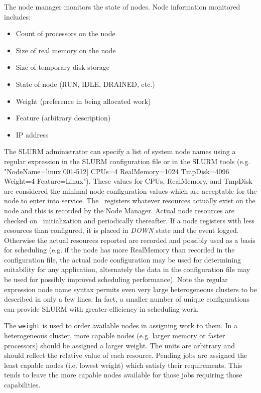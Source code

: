 The node manager monitors the state of nodes.  
Node information monitored includes:

\begin{itemize}
\item Count of processors on the node
\item Size of real memory on the node
\item Size of temporary disk storage
\item State of node (RUN, IDLE, DRAINED, etc.)
\item Weight (preference in being allocated work)
\item Feature (arbitrary description)
\item IP address
\end{itemize}

The SLURM administrator can specify a list of system node
names using a regular expression in the SLURM configuration file 
or in the SLURM tools (e.g. "NodeName=linux[001-512] CPUs=4
RealMemory=1024 TmpDisk=4096 Weight=4 Feature=Linux").  These values
for CPUs, RealMemory, and TmpDisk are considered the minimal
node configuration values which are acceptable for the node to enter
into service.  The \slurmd\ registers whatever resources actually
exist on the node and this is recorded by the Node Manager.
Actual node resources are checked on \slurmd\ initialization and
periodically thereafter.  
If a node registers with less resources than configured, it
is placed in {\em DOWN} state and the event logged.  Otherwise the
actual resources reported are recorded and possibly used as a basis 
for scheduling (e.g. if the node has more RealMemory than recorded in 
the configuration file, the actual node configuration may be used for 
determining suitability for any application, alternately the data in 
the configuration file may be used for possibly improved scheduling performance).
Note the regular expression node name syntax permits even very large
heterogeneous clusters to be described in only a few lines.  In fact,
a smaller number of unique configurations can provide SLURM with greater
efficiency in scheduling work.

The {\tt weight} is used to order available nodes in assigning work to them.
In a heterogeneous cluster, more capable nodes (e.g. larger memory
or faster processors) should be assigned a larger weight.  The units
are arbitrary and should reflect the relative value of each resource.
Pending jobs are assigned the least capable nodes (i.e. lowest
weight) which satisfy their requirements.  This tends to leave the
more capable nodes available for those jobs requiring those capabilities.


